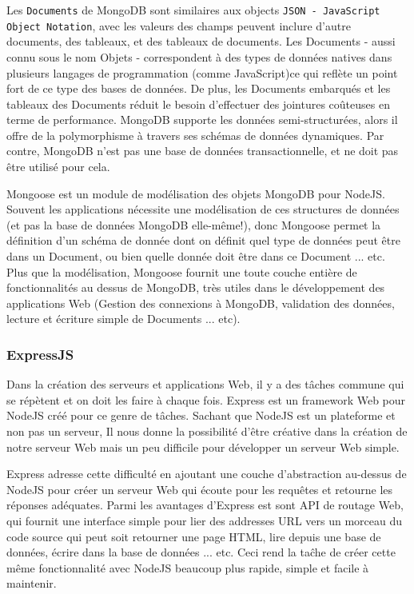 Les \texttt{Documents} de MongoDB sont similaires aux objects \texttt{JSON - JavaScript Object Notation}\cite{json}, avec les valeurs des champs peuvent inclure d'autre documents, des tableaux, et des tableaux de documents. Les Documents - aussi connu sous le nom Objets - correspondent à des types de données natives dans plusieurs langages de programmation (comme JavaScript)ce qui reflète un point fort de ce type des bases de données. De plus, les Documents embarqués et les tableaux des Documents réduit le besoin d'effectuer des jointures coûteuses en terme de performance. MongoDB supporte les données semi-structurées, alors il offre de la polymorphisme à travers ses schémas de données dynamiques. Par contre, MongoDB n'est pas une base de données transactionnelle, et ne doit pas être utilisé pour cela\cite{mongoDBAndMySQLCompared}.
\newline

Mongoose est un module de modélisation des objets MongoDB pour NodeJS. Souvent les applications nécessite une modélisation de ces structures de données (et pas la base de données MongoDB elle-même!), donc Mongoose permet la définition d'un schéma de donnée dont on définit quel type de données peut être dans un Document, ou bien quelle donnée doit être dans ce Document ... etc. Plus que la modélisation, Mongoose fournit une toute couche entière de fonctionnalités au dessus de MongoDB, très utiles dans le développement des applications Web (Gestion des connexions à MongoDB, validation des données, lecture et écriture simple de Documents ... etc).\cite{mongooseDocs}

\subsubsection{ExpressJS}

Dans la création des serveurs et applications Web, il y a des tâches commune qui se répètent et on doit les faire à chaque fois. Express est un framework Web pour NodeJS créé pour ce genre de tâches. Sachant que NodeJS est un plateforme et non pas un serveur, Il nous donne la possibilité d'être créative dans la création de notre serveur Web mais un peu difficile pour développer un serveur Web simple. 
\newline

Express adresse cette difficulté en ajoutant une couche d'abstraction au-dessus de NodeJS pour créer un serveur Web qui écoute pour les requêtes et retourne les réponses adéquates. Parmi les avantages d'Express est sont API de routage Web, qui fournit une interface simple pour lier des addresses URL vers un morceau du code source qui peut soit retourner une page HTML, lire depuis une base de données, écrire dans la base de données ... etc. Ceci rend la taĉhe de créer cette même fonctionnalité avec NodeJS beaucoup plus rapide, simple et facile à maintenir.

